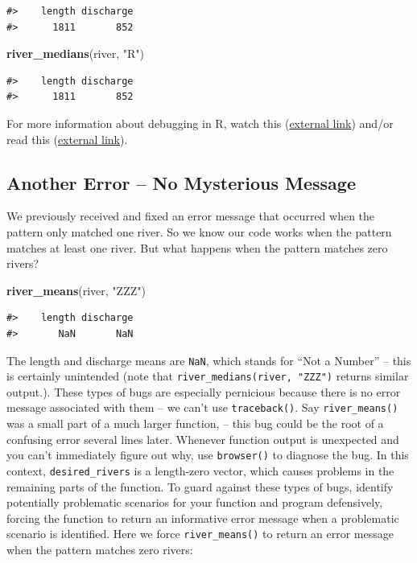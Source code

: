\documentclass[
]{book}
\newenvironment{Shaded}{\begin{snugshade}}{\end{snugshade}}
\newcommand{\KeywordTok}[1]{\textcolor[rgb]{0.13,0.29,0.53}{\textbf{#1}}}
\newcommand{\NormalTok}[1]{#1}
\newcommand{\StringTok}[1]{\textcolor[rgb]{0.31,0.60,0.02}{#1}}
\begin{document}
\begin{verbatim}
#>    length discharge 
#>      1811       852
\end{verbatim}

\begin{Shaded}
\begin{Highlighting}[]
\KeywordTok{river_medians}\NormalTok{(river, }\StringTok{"R"}\NormalTok{)}
\end{Highlighting}
\end{Shaded}

\begin{verbatim}
#>    length discharge 
#>      1811       852
\end{verbatim}

For more information about debugging in R, watch this (\href{https://www.rstudio.com/resources/rstudioconf-2020/object-of-type-closure-is-not-subsettable/}{external link}) and/or read this (\href{https://adv-r.hadley.nz/debugging.html}{external link}).

\hypertarget{error-zeromatch}{%
\subsection{Another Error -- No Mysterious Message}\label{error-zeromatch}}

We previously received and fixed an error message that occurred when the pattern only matched one river. So we know our code works when the pattern matches at least one river. But what happens when the pattern matches zero rivers?

\begin{Shaded}
\begin{Highlighting}[]
\KeywordTok{river_means}\NormalTok{(river, }\StringTok{"ZZZ"}\NormalTok{)}
\end{Highlighting}
\end{Shaded}

\begin{verbatim}
#>    length discharge 
#>       NaN       NaN
\end{verbatim}

The length and discharge means are \texttt{NaN}, which stands for ``Not a Number'' -- this is certainly unintended (note that \texttt{river\_medians(river,\ "ZZZ")} returns similar output.). These types of bugs are especially pernicious because there is no error message associated with them -- we can't use \texttt{traceback()}. Say \texttt{river\_means()} was a small part of a much larger function, -- this bug could be the root of a confusing error several lines later. Whenever function output is unexpected and you can't immediately figure out why, use \texttt{browser()} to diagnose the bug. In this context, \texttt{desired\_rivers} is a length-zero vector, which causes problems in the remaining parts of the function. To guard against these types of bugs, identify potentially problematic scenarios for your function and program defensively, forcing the function to return an informative error message when a problematic scenario is identified. Here we force \texttt{river\_means()} to return an error message when the pattern matches zero rivers:
\end{document}
